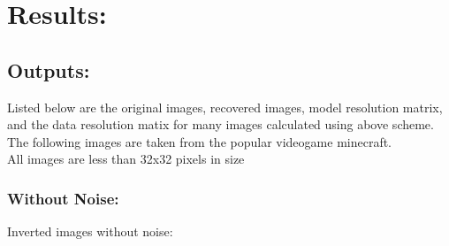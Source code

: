 \documentclass{article}
\begin{document}
\section{Results:}
\subsection{Outputs:}
Listed below are the original images, recovered images, model resolution matrix, and the data resolution matix
for many images calculated using above scheme. The following images are taken from the popular videogame minecraft.\\
All images are less than 32x32 pixels in size
\subsubsection{Without Noise:}
Inverted images without noise:
\clearpage
\end{document}
